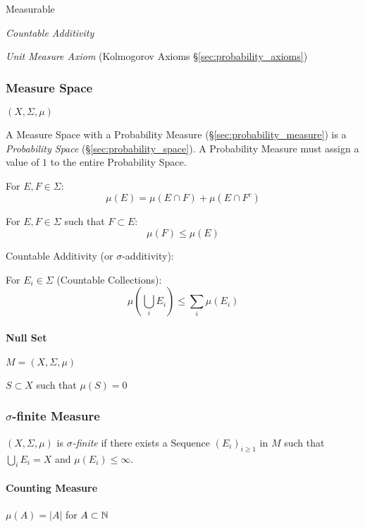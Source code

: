 Measurable

\emph{Countable Additivity}

\fist \emph{Unit Measure Axiom} (Kolmogorov Axioms
\S\ref{sec:probability_axioms})



\subsubsection{Measure Space}\label{sec:measure_space}

$(X,\Sigma,\mu)$

A Measure Space with a Probability Measure (\S\ref{sec:probability_measure}) is
a \emph{Probability Space} (\S\ref{sec:probability_space}). A Probability
Measure must assign a value of $1$ to the entire Probability Space.

For $E,F \in \Sigma$:
\[
  \mu(E) = \mu(E \cap F) + \mu(E \cap F^c)
\]

For $E,F \in \Sigma$ such that $F \subset E$:
\[
  \mu(F) \leq \mu(E)
\]

Countable Additivity (or $\sigma$-additivity): %

For $E_i \in \Sigma$ (Countable Collections):
\[
  \mu(\bigcup_i E_i) \leq \sum_i \mu(E_i)
\]



\paragraph{Null Set}\label{sec:null_set}\hfill

$M = (X, \Sigma, \mu)$

$S \subset X$ such that $\mu(S) = 0$



\subsubsection{$\sigma$-finite Measure}\label{sec:sigma_finite}

$(X,\Sigma,\mu)$ is \emph{$\sigma$-finite} if there exists a Sequence
$(E_i)_{i \geq 1}$ in $M$ such that $\bigcup_{i} E_i = X$ and
$\mu(E_i) \leq \infty$.



\paragraph{Counting Measure}\label{sec:counting_measure}\hfill

$\mu(A) = |A|$ for $A \subset \mathbb{N}$



